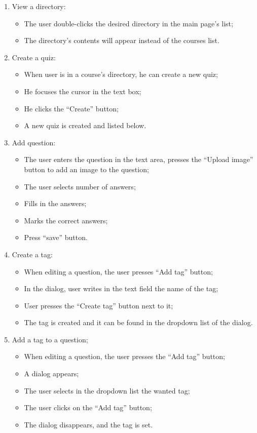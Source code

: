 \begin{enumerate}
  \item View a directory:
  \begin{itemize}
    \item The user double-clicks the desired directory in the main page’s list;
    \item The directory’s contents will appear instead of the courses list.
  \end{itemize}  

  \item Create a quiz:
  \begin{itemize}
    \item When user is in a course's directory, he can create a new quiz;
    \item He focuses the cursor in the text box;
    \item He clicks the ``Create'' button;
    \item A new quiz is created and listed below.
  \end{itemize}

  \item Add question:
  \begin{itemize}
    \item The user enters the question in the text area, presses the “Upload image” button to add an image to the question;
    \item The user selects number of answers;
    \item Fills in the answers;
    \item Marks the correct answers;
    \item Press “save” button.
  \end{itemize}

  \item Create a tag:
  \begin{itemize}
    \item When editing a question, the user presses “Add tag” button;
    \item In the dialog, user writes in the text field the name of the tag;
    \item User presses the “Create tag” button next to it;
    \item The tag is created and it can be found in the dropdown list of the dialog.
  \end{itemize}

  \item Add a tag to a question;
  \begin{itemize}
    \item When editing a question, the user presses the “Add tag” button;
    \item A dialog appears;
    \item The user selects in the dropdown list the wanted tag;
    \item The user clicks on the “Add tag” button;
    \item The dialog disappears, and the tag is set.
  \end{itemize}    


\end{enumerate}
